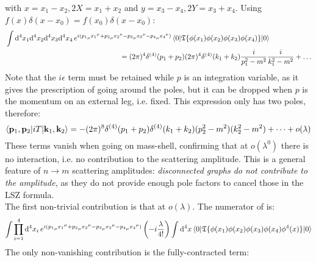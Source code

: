 with $ x = x_1 - x_2 , 2X = x_1 + x_2 $ and $ y = x_3 - x_4 , 2Y = x_3 + x_4 $. Using $ f(x) \delta(x - x_0) = f(x_0) \delta(x - x_0) $:
\begin{equation*}
  \begin{split}
    & \int \mathrm{d}^4x_1 \mathrm{d}^4x_2 \mathrm{d}^4x_3 \mathrm{d}^4x_4\, e^{i ({p_1}_\mu {x_1}^\mu + {p_2}_\mu {x_2}^\mu - {p_3}_\mu {x_3}^\mu - {p_4}_\mu {x_4}^\mu)} \braket{0 | \mathfrak{T}\{\phi(x_1) \phi(x_2) \phi(x_3) \phi(x_4)\} | 0} \\
    & \qquad \qquad \qquad \qquad \qquad \qquad \qquad \qquad = (2\pi)^4 \delta^{(4)}(p_1 + p_2) (2\pi)^4 \delta^{(4)}(k_1 + k_2) \frac{i}{p_1^2 - m^2} \frac{i}{k_1^2 - m^2} + \dots
  \end{split}
\end{equation*}
Note that the $ i\epsilon $ term must be retained while $ p $ is an integration variable, as it gives the prescription of going around the poles, but it can be dropped when $ p $ is the momentum on an external leg, i.e. fixed. This expression only has two poles, therefore:
\begin{equation*}
  \braket{\mathbf{p}_1 , \mathbf{p}_2 | i T | \mathbf{k}_1 , \mathbf{k}_2} = - (2\pi)^8 \delta^{(4)}(p_1 + p_2) \delta^{(4)}(k_1 + k_2) (p_2^2 - m^2) (k_2^2 - m^2) + \dots + o(\lambda)
\end{equation*}
These terms vanish when going on mass-shell, confirming that at $ o(\lambda^0) $ there is no interaction, i.e. no contribution to the scattering amplitude. This is a general feature of $ n \rightarrow m $ scattering amplitudes: \textit{disconnected graphs do not contribute to the amplitude}, as they do not provide enough pole factors to cancel those in the LSZ formula. \\
The first non-trivial contribution is that at $ o(\lambda) $. The numerator of  is:
\begin{equation*}
  \int \prod_{i = 1}^4 \mathrm{d}^4x_i\, e^{i ({p_1}_\mu {x_1}^\mu + {p_2}_\mu {x_2}^\mu - {p_3}_\mu {x_3}^\mu - {p_4}_\mu {x_4}^\mu)} \left( - i \frac{\lambda}{4!} \right) \int \mathrm{d}^4x \braket{0 | \mathfrak{T}\{\phi(x_1) \phi(x_2) \phi(x_3) \phi(x_4) \phi^4(x)\} | 0}
\end{equation*}
The only non-vanishing contribution is the fully-contracted term:

